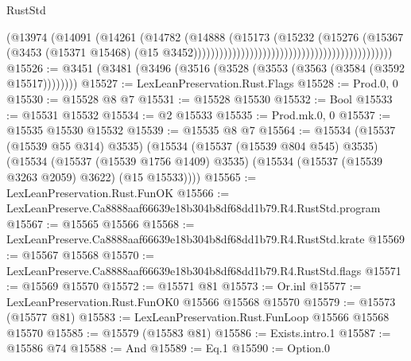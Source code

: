 \begin{lexlean}{RustStd}
\begin{coremodule}
                                                                          (@13974
                                                                            (@14091
                                                                              (@14261
                                                                                (@14782
                                                                                  (@14888
                                                                                    (@15173
                                                                                      (@15232
                                                                                        (@15276
                                                                                          (@15367
                                                                                            (@3453
                                                                                              (@15371
                                                                                                @15468)
                                                                                              (@15
                                                                                                @3452))))))))))))))))))))))))))))))))))))))))))))))
@15526 := @3451 (@3481 (@3496 (@3516 (@3528 (@3553 (@3563 (@3584 (@3592 @15517))))))))
@15527 := LexLeanPreservation.Rust.Flags
@15528 := Prod.{0, 0}
@15530 := @15528 @8 @7
@15531 := @15528 @15530
@15532 := Bool
@15533 := @15531 @15532
@15534 := @2 @15533
@15535 := Prod.mk.{0, 0}
@15537 := @15535 @15530 @15532
@15539 := @15535 @8 @7
@15564 := @15534
    (@15537 (@15539 @55 @314) @3535)
    (@15534
      (@15537 (@15539 @804 @545) @3535)
      (@15534
        (@15537 (@15539 @1756 @1409) @3535)
        (@15534 (@15537 (@15539 @3263 @2059) @3622) (@15 @15533))))
@15565 := LexLeanPreservation.Rust.FunOK
@15566 := LexLeanPreserve.Ca8888aaf66639e18b304b8df68dd1b79.R4.RustStd.program
@15567 := @15565 @15566
@15568 := LexLeanPreserve.Ca8888aaf66639e18b304b8df68dd1b79.R4.RustStd.krate
@15569 := @15567 @15568
@15570 := LexLeanPreserve.Ca8888aaf66639e18b304b8df68dd1b79.R4.RustStd.flags
@15571 := @15569 @15570
@15572 := @15571 @81
@15573 := Or.inl
@15577 := LexLeanPreservation.Rust.FunOK0 @15566 @15568 @15570
@15579 := @15573 (@15577 @81)
@15583 := LexLeanPreservation.Rust.FunLoop @15566 @15568 @15570
@15585 := @15579 (@15583 @81)
@15586 := Exists.intro.{1}
@15587 := @15586 @74
@15588 := And
@15589 := Eq.{1}
@15590 := Option.{0}

\end{coremodule}
\end{lexlean}
